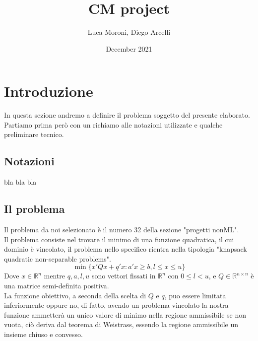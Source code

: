 \documentclass{article}
\title{CM project}
\author{Luca Moroni, Diego Arcelli}
\date{December 2021}
\begin{document}
\maketitle

\section{Introduzione}
In questa sezione andremo a definire il problema soggetto del presente elaborato.\\
Partiamo prima però con un richiamo alle notazioni utilizzate e qualche preliminare tecnico.
\subsection{Notazioni}
bla bla bla
\subsection{Il problema}
Il problema da noi selezionato è il numero 32 della sezione "progetti nonML".\\
Il problema consiste nel trovare il minimo di una funzione quadratica, il cui dominio è vincolato, il problema nello specifico rientra nella tipologia "knapsack quadratic non-separable problems".\\
\[\min \{x'Qx + q'x : a'x \geq b, l \leq x \leq u\}\]
Dove $x \in \mathbb{R}^n$ mentre $q, a, l, u$  sono vettori fissati in $\mathbb{R}^n$ con $0 \leq l < u$, e $Q \in \mathbb{R}^{n \times n}$ è una matrice semi-definita positiva.\\
La funzione obiettivo, a seconda della scelta di $Q$ e $q$, puo essere limitata inferiormente oppure no, di fatto, avendo un problema vincolato la nostra funzione ammetterà un unico valore di minimo nella regione ammissibile se non vuota, ciò deriva dal teorema di Weistrass, essendo la regione ammissibile un insieme chiuso e convesso.
\end{document}
